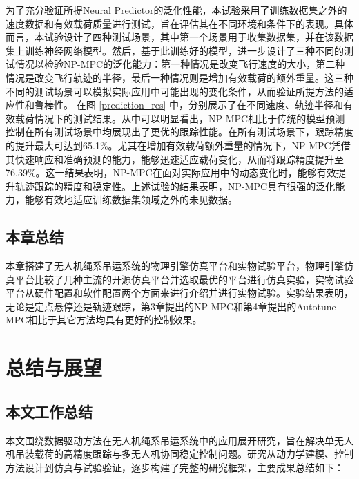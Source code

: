 \documentclass[lang=chs, degree=master, blindreview=true, winfonts=true]{yanputhesis}
\begin{document}
为了充分验证所提Neural Predictor的泛化性能，本试验采用了训练数据集之外的速度数据和有效载荷质量进行测试，旨在评估其在不同环境和条件下的表现。具体而言，本试验设计了四种测试场景，其中第一个场景用于收集数据集，并在该数据集上训练神经网络模型。然后，基于此训练好的模型，进一步设计了三种不同的测试情况以检验NP-MPC的泛化能力：第一种情况是改变飞行速度的大小，第二种情况是改变飞行轨迹的半径，最后一种情况则是增加有效载荷的额外重量。这三种不同的测试场景可以模拟实际应用中可能出现的变化条件，从而验证所提方法的适应性和鲁棒性。
在图 \ref{prediction_res} 中，分别展示了在不同速度、轨迹半径和有效载荷情况下的测试结果。从中可以明显看出，NP-MPC相比于传统的模型预测控制在所有测试场景中均展现出了更优的跟踪性能。在所有测试场景下，跟踪精度的提升最大可达到65.1\%。尤其在增加有效载荷额外重量的情况下，NP-MPC凭借其快速响应和准确预测的能力，能够迅速适应载荷变化，从而将跟踪精度提升至76.39\%。这一结果表明，NP-MPC在面对实际应用中的动态变化时，能够有效提升轨迹跟踪的精度和稳定性。上述试验的结果表明，NP-MPC具有很强的泛化能力，能够有效地适应训练数据集领域之外的未见数据。


\section{本章总结}
本章搭建了无人机绳系吊运系统的物理引擎仿真平台和实物试验平台，物理引擎仿真平台比较了几种主流的开源仿真平台并选取最优的平台进行仿真实验，实物试验平台从硬件配置和软件配置两个方面来进行介绍并进行实物试验。实验结果表明，无论是定点悬停还是轨迹跟踪，第3章提出的NP-MPC和第4章提出的Autotune-MPC相比于其它方法均具有更好的控制效果。


\chapter{总结与展望}


\section{本文工作总结}
本文围绕数据驱动方法在无人机绳系吊运系统中的应用展开研究，旨在解决单无人机吊装载荷的高精度跟踪与多无人机协同稳定控制问题。研究从动力学建模、控制方法设计到仿真与试验验证，逐步构建了完整的研究框架，主要成果总结如下：
\end{document}
